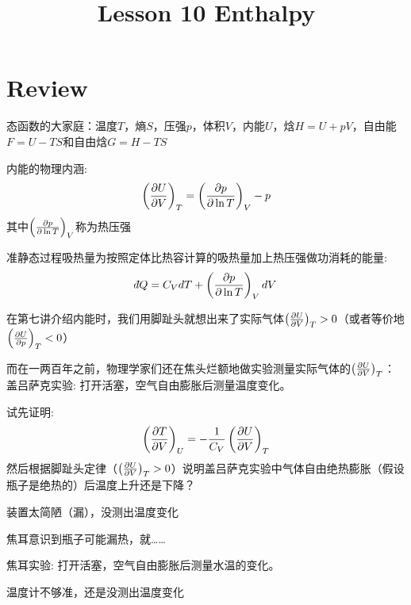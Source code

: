 \documentclass[CJK]{beamer}
\title{Lesson 10 Enthalpy}
\author{}
\date{}
\begin{document}

\section{Review}

\begin{frame}
\bch 
\bitem
\item{态函数的大家庭：温度$T$，熵$S$，压强$p$，体积$V$，内能$U$，焓$H=U+pV$，自由能$F=U-TS$和自由焓$G=H-TS$}
\item{内能的物理内涵:
 $$\left(\frac{\partial U}{\partial V}\right)_{T} = \left(\frac{\partial p}{\partial \ln T}\right)_{V} - p $$
其中$\left(\frac{\partial p}{\partial \ln T}\right)_{V}$称为热压强}
\item{准静态过程吸热量为按照定体比热容计算的吸热量加上热压强做功消耗的能量:
$$ \dbar Q = C_V dT + \pfrac p{\ln T}V dV$$}
\eitem
\ech
\end{frame}

\begin{frame}
\bch
在第七讲介绍内能时，我们用脚趾头就想出来了实际气体$\left(\frac{\partial U}{\partial V}\right)_{T} > 0$（或者等价地$\left(\frac{\partial U}{\partial p}\right)_{T} < 0$）

而在一两百年之前，物理学家们还在焦头烂额地做实验测量实际气体的$\left(\frac{\partial U}{\partial V}\right)_{T} $：
盖吕萨克实验: 打开活塞，空气自由膨胀后测量温度变化。
\emini
{}
\emini

\ech
\end{frame}


\begin{frame}
\bch
试先证明:
$$\left(\frac{\partial T}{\partial V}\right)_{U} = -\frac{1}{C_V} \left(\frac{\partial U}{\partial V}\right)_{T} $$
然后根据脚趾头定律（$\left(\frac{\partial U}{\partial V}\right)_{T} >0$）说明盖吕萨克实验中气体自由绝热膨胀（假设瓶子是绝热的）后温度上升还是下降？
\ech
\end{frame}


\begin{frame}
\bch
装置太简陋（漏），没测出温度变化 \bye
\ech
\end{frame}

\begin{frame}
\bch
焦耳意识到瓶子可能漏热，就……

焦耳实验: 打开活塞，空气自由膨胀后测量水温的变化。
\emini
{}
\emini

\ech
\end{frame}


\begin{frame}
\bch
温度计不够准，还是没测出温度变化 \bye
\ech
\end{frame}
\end{document}
